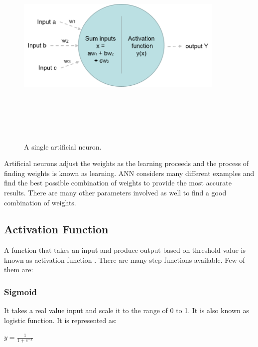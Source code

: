 \begin{figure}[htpb]
	\centering
	\includegraphics[width=10cm,height=10cm,keepaspectratio=true]{images/single-neuron}
	\caption{
		A single artificial neuron.
	}
	\label{fig:single-neuron}
\end{figure}

Artificial neurons adjust the weights as the learning proceeds and the process of finding weights is known as learning. ANN considers many different examples and find the best possible combination of weights to provide the most accurate results. There are many other parameters involved as well to find a good combination of weights.

\subsection{Activation Function}

A function that takes an input and produce output based on threshold value is known as activation function \cite{ujjwalkarn}. There are many step functions available. Few of them are:

\subsubsection{Sigmoid}
It takes a real value input and scale it to the range of 0 to 1. It is also known as logistic function. It is represented as:

\begin{center}
$y = \frac{1}{1 + e^{-x}}$
\end{center}

